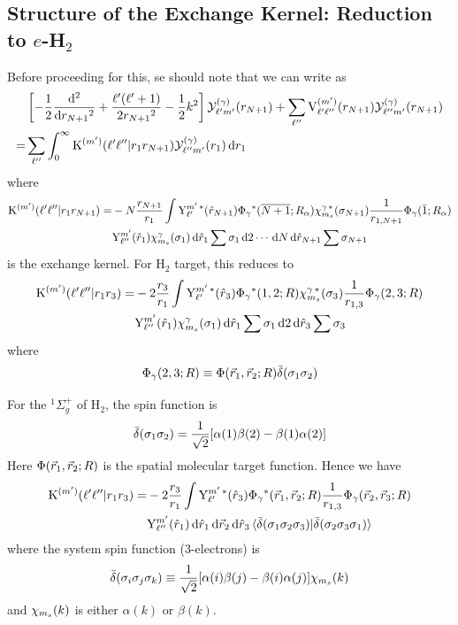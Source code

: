 \documentclass[aps,pra,groupedaddress,12pt,
               amsfonts,amssymb,
               preprint
    ]{revtex4}
\begin{document}
\subsection{Structure of the Exchange Kernel: Reduction to $e$-H$_2$}
\label{sec:struct-exch-kern}
Before proceeding for this, se should note that we can write 
as
\begin{equation}
  \label{eq:essce}
    \begin{split}
    &\left[-\dfrac{1}{2}\dfrac{\mathrm{d}^2}{\mathrm{d}
        r_{N+1}{}^2}+\dfrac{\ell'(\ell'+1)}{2r_{N+1}{}^2}-\dfrac{1}{2}k^2\right]\mathcal{Y}_{\ell'm'}^{(\gamma)}(r_{N+1}) 
      + \sum_{\ell''}\mathrm{V}_{\ell'\ell''}^{(m')}(r_{N+1})\mathcal{Y}_{\ell''m'}^{(\gamma)}(r_{N+1}) \\
   = &\sum_{\ell''}\int_0^{\infty}\mathrm{K}^{(m')}(\ell'\ell''|r_1r_{N+1})\mathcal{Y}_{\ell''m'}^{(\gamma)}(r_1)\,\mathrm{d} r_1
  \end{split}
\end{equation}
where
\begin{equation}
  \label{eq:kex}
  \begin{split}
  \mathrm{K}^{(m')}(\ell'\ell''|r_1r_{N+1}) = &
  -N\dfrac{r_{N+1}}{r_1}\int\mathrm{Y}_{\ell'}^{m'\,*}(\hat{r}_{N+1})\Phi_\gamma{}^*(\overline{N+1};R_\alpha)\chi_{m_s}^{\gamma\,*}(\sigma_{N+1})\dfrac{1}{r_{1,N+1}}\Phi_\gamma(\bar{1};R_\alpha) \\ 
  &\mathrm{Y}_{\ell''}^{m'}(\hat{r}_1)\chi_{m_s}^{\gamma}(\sigma_1)\,\mathrm{d}\hat{r}_1\sum\sigma_1\,\mathrm{d} 2\cdots\,\mathrm{d}
  N\,\mathrm{d}\hat{r}_{N+1}\sum\sigma_{N+1}
 \end{split}
\end{equation}
is the exchange kernel. For H$_2$ target, this reduces to 
\begin{equation}
  \label{eq:kexh}
  \begin{split}
  \mathrm{K}^{(m')}(\ell'\ell''|r_1r_3) = &
  -2\dfrac{r_3}{r_1}\int\mathrm{Y}_{\ell'}^{m'\,*}(\hat{r}_3)\Phi_\gamma{}^*(1,2;R)\chi_{m_s}^{\gamma\,*}(\sigma_3)\dfrac{1}{r_{1,3}}\Phi_\gamma(2,3;R) \\ 
  &\mathrm{Y}_{\ell''}^{m'}(\hat{r}_1)\chi_{m_s}^{\gamma}(\sigma_1)\,\mathrm{d}\hat{r}_1\sum\sigma_1\,\mathrm{d} 2\,\mathrm{d}\hat{r}_3\sum\sigma_3
 \end{split}
\end{equation}
where
\begin{equation}
  \label{eq:ewah}
  \Phi_\gamma(2,3;R) \equiv \Phi(\vec{r}_1,\vec{r}_2;R)\bar\delta(\sigma_1\sigma_2)
\end{equation}

For the $^1\Sigma_g^+$ of H$_2$, the spin function is
\begin{equation}
  \label{eq:tswh}
  \bar\delta(\sigma_1\sigma_2) = \dfrac{1}{\sqrt{2}}[\alpha(1)\beta(2)-\beta(1)\alpha(2)]
\end{equation}
Here $\Phi(\vec{r}_1,\vec{r}_2;R)$ is the spatial molecular target
function. Hence we have
\begin{equation}
  \label{eq:kexha}
  \begin{split}
  \mathrm{K}^{(m')}(\ell'\ell''|r_1r_3) = &
  -2\dfrac{r_3}{r_1}\int\mathrm{Y}_{\ell'}^{m'\,*}(\hat{r}_3)\Phi_\gamma{}^*(\vec{r}_{1},\vec{r}_{2};R)\dfrac{1}{r_{1,3}}\Phi_\gamma(\vec{r}_{2},\vec{r}_{3};R) \\ 
  &\mathrm{Y}_{\ell''}^{m'}(\hat{r}_1)\,\mathrm{d}\hat{r}_1\,\mathrm{d}\vec{r}_2\,\mathrm{d}\hat{r}_3
   \mathinner{\langle{\bar\delta(\sigma_1\sigma_2\sigma_3)|\bar\delta(\sigma_2\sigma_3\sigma_1)}\rangle}
 \end{split}
\end{equation}
where the system spin function (3-electrons) is
\begin{equation}
  \label{eq:tsws}
  \bar\delta(\sigma_i\sigma_j\sigma_k) \equiv \dfrac{1}{\sqrt{2}}
  [\alpha(i)\beta(j)-\beta(i)\alpha(j)]\chi_{m_s}(k)
\end{equation}
and $\chi_{m_s}(k)$ is either $\alpha(k)$ or $\beta(k)$.
\end{document}
